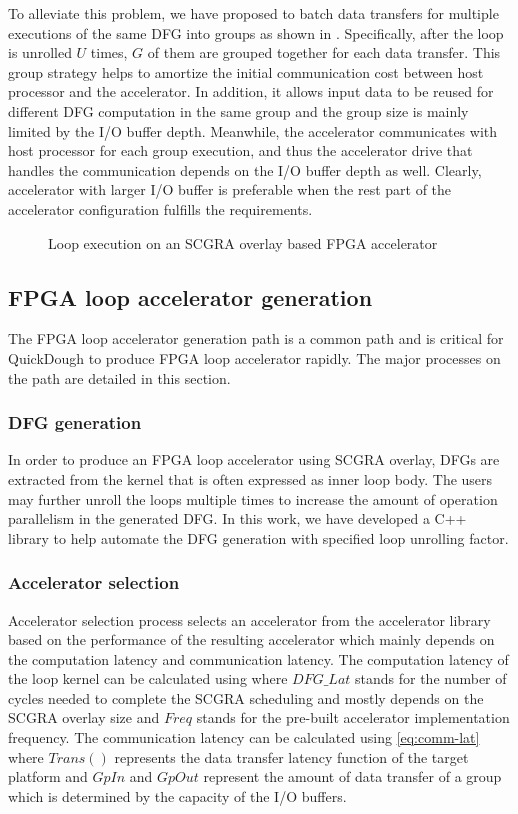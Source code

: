 To alleviate this problem, we have proposed to batch data transfers for multiple executions of the
same DFG into groups as shown in . Specifically, after the loop is
unrolled $U$ times, $G$ of them are grouped together for each data transfer. This group strategy
helps to amortize the initial communication cost between host processor and the accelerator. In
addition, it allows input data to be reused for different DFG computation in the same group and the
group size is mainly limited by the I/O buffer depth. Meanwhile, the accelerator communicates with
host processor for each group execution, and thus the accelerator drive that handles the communication
depends on the I/O buffer depth as well. Clearly, accelerator with larger I/O buffer is
preferable when the rest part of the accelerator configuration fulfills the requirements. 


\begin{figure}
\caption{Loop execution on an SCGRA overlay based FPGA accelerator}
\label{fig:blocking-and-dfg-gen}
\end{figure}


\subsection{FPGA loop accelerator generation}
The FPGA loop accelerator generation path is a common path and is critical for QuickDough to produce
FPGA loop accelerator rapidly. The major processes on the path are detailed in this section.

\subsubsection{DFG generation}
In order to produce an FPGA loop accelerator using SCGRA overlay, DFGs are extracted from the kernel
that is often expressed as inner loop body. The users may further unroll the loops multiple times to
increase the amount of operation parallelism in the generated DFG. In this work, we have developed a
C++ library to help automate the DFG generation with specified loop unrolling factor.

\subsubsection{Accelerator selection}
Accelerator selection process selects an accelerator from the accelerator library based on the
performance of the resulting accelerator which mainly depends on the computation latency and
communication latency. The computation latency of the loop kernel can be calculated using
 where $DFG\_Lat$ stands for the number of cycles needed to complete the SCGRA
scheduling and mostly depends on the SCGRA overlay size and $Freq$ stands for the pre-built
accelerator implementation frequency. The communication latency can be calculated using
\eqref{eq:comm-lat} where $Trans()$ represents the
data transfer latency function of the target platform and $GpIn$ and $GpOut$ represent the amount of
data transfer of a group which is determined by the capacity of the I/O buffers. 

